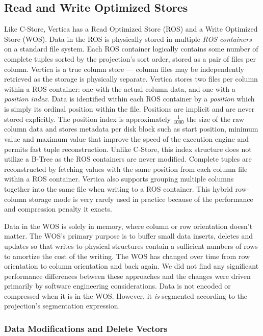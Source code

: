 \documentclass[a4paper,12pt,notitlepage,twoside,openright]{article}
\begin{document}
\hypertarget{read-and-write-optimized-stores}{%
\subsection{Read and Write Optimized
Stores}\label{read-and-write-optimized-stores}}

Like C-Store, Vertica has a Read Optimized Store (ROS) and a Write
Optimized Store (WOS). Data in the ROS is physically stored in multiple
\emph{ROS containers} on a standard file system. Each ROS container
logically contains some number of complete tuples sorted by the
projection's sort order, stored as a pair of files per column. Vertica
is a true column store --- column files may be independently retrieved as
the storage is physically separate. Vertica stores two files per column
within a ROS container: one with the actual column data, and one with a
\emph{position index}. Data is identified within each ROS container by a
\emph{position} which is simply its ordinal position within the file.
Positions are implicit and are never stored explicitly. The position
index is approximately \(\frac{1}{1000}\) the
size of the raw column data and stores metadata per disk block such as
start position, minimum value and maximum value that improve the speed
of the execution engine and permits fast tuple reconstruction. Unlike
C-Store, this index structure does not utilize a B-Tree as the ROS
containers are never modified. Complete tuples are reconstructed by
fetching values with the same position from each column file within a
ROS container. Vertica also supports grouping multiple columns together
into the same file when writing to a ROS container. This hybrid
row-column storage mode is very rarely used in practice because of the
performance and compression penalty it exacts.

Data in the WOS is solely in memory, where column or row orientation
doesn't matter. The WOS's primary purpose is to buffer small data
inserts, deletes and updates so that writes to physical structures
contain a sufficient numbers of rows to amortize the cost of the
writing. The WOS has changed over time from row orientation to column
orientation and back again. We did not find any significant performance
differences between these approaches and the changes were driven
primarily by software engineering considerations. Data is not encoded or
compressed when it is in the WOS. However, it \emph{is} segmented
according to the projection's segmentation expression.

\hypertarget{data-modifications-and-delete-vectors}{%
\subsubsection{Data Modifications and Delete
Vectors}\label{data-modifications-and-delete-vectors}}
\end{document}
